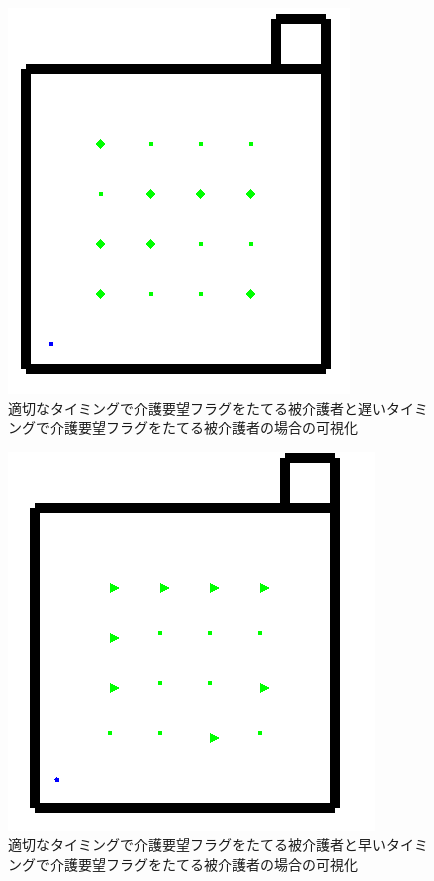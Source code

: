 \begin{figure}[htb]
\begin{center}
 \includegraphics[scale=0.5]{figures/health_urinate.png}
 \caption[適切なタイミングで介護要望フラグをたてる被介護者と遅いタイミングで介護要望フラグをたてる被介護者の場合の可視化]{適切なタイミングで介護要望フラグをたてる被介護者と遅いタイミングで介護要望フラグをたてる被介護者の場合の可視化 \label{health_urinate}}
\end{center}
\end{figure}

\begin{figure}[htb]
\begin{center}
 \includegraphics[scale=0.5]{figures/health_frequently_urinate_v1.png}
 \caption[適切なタイミングで介護要望フラグをたてる被介護者と早いタイミングで介護要望フラグをたてる被介護者の場合の可視化]{適切なタイミングで介護要望フラグをたてる被介護者と早いタイミングで介護要望フラグをたてる被介護者の場合の可視化 \label{health_frequently_urinate_v1}}
\end{center}
\end{figure}

